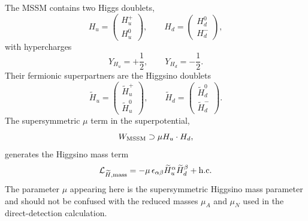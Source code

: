 \documentclass[aps,prd,reprint,superscriptaddress,nofootinbib,longbibliography,floatfix]{revtex4-2}
\begin{document}
The MSSM contains two Higgs doublets,
\begin{equation}
H_u=
\begin{pmatrix}
H_u^+\\
H_u^0
\end{pmatrix},
\qquad
H_d=
\begin{pmatrix}
H_d^0\\
H_d^-
\end{pmatrix},
\end{equation}
with hypercharges
\begin{equation}
Y_{H_u}=+\frac{1}{2},
\qquad
Y_{H_d}=-\frac{1}{2}.
\end{equation}
Their fermionic superpartners are the Higgsino doublets
\begin{equation}
\widetilde H_u=
\begin{pmatrix}
\widetilde H_u^+\\
\widetilde H_u^0
\end{pmatrix},
\qquad
\widetilde H_d=
\begin{pmatrix}
\widetilde H_d^0\\
\widetilde H_d^-
\end{pmatrix}.
\end{equation}
The supersymmetric $\mu$ term in the superpotential,
\begin{equation}
W_{\rm MSSM}\supset
\mu H_u\cdot H_d,
\end{equation}
generates the Higgsino mass term
\begin{equation}
\mathcal{L}_{\widetilde H,{\rm mass}}
=
-\mu\,
\epsilon_{\alpha\beta}
\widetilde H_u^\alpha
\widetilde H_d^\beta
+\mathrm{h.c.}
\label{eq:higgsino_mu_term}
\end{equation}
The parameter $\mu$ appearing here is the supersymmetric Higgsino mass parameter and should not be confused with the reduced masses $\mu_A$ and $\mu_N$ used in the direct-detection calculation.
\end{document}
